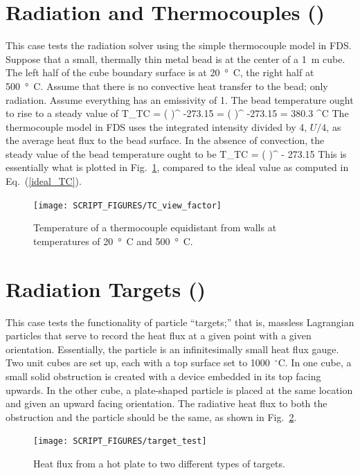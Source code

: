\documentclass[11pt]{book}
\begin{document}
\section{Radiation and Thermocouples (\texorpdfstring{}{TC\_view\_factor}) }
\label{TC_view_factor}

This case tests the radiation solver using the simple thermocouple model in FDS.  Suppose that a small, thermally thin metal bead is at the center of a 1~m cube. The left half of the cube boundary surface is at 20~\si{\degree C}, the right half at 500~\si{\degree C}. Assume that there is no convective heat transfer to the bead; only radiation. Assume everything has an emissivity of 1. The bead temperature ought to rise to a steady value of
\be
   T_{\hbox{\tiny TC}} = \left(  \right)^ -273.15 = \left(  \right)^ -273.15 = 380.3 \quad ^\circ \hbox{C}
   \label{ideal_TC}
\ee
The thermocouple model in FDS uses the integrated intensity divided by 4, $U/4$, as the average heat flux to the bead surface. In the absence of convection, the steady value of the bead temperature ought to be
\be
   T_{\hbox{\tiny TC}} = \left(  \right)^ - 273.15
\ee
This is essentially what is plotted in Fig.~\ref{TC_view_factor_plot}, compared to the ideal value as computed in Eq.~(\ref{ideal_TC}).
\begin{figure}[ht]
\centering
\texttt{[image: SCRIPT\_FIGURES/TC\_view\_factor]}
\caption[Radiation/thermocouple test case]{Temperature of a thermocouple equidistant from walls at temperatures of 20~\si{\degree C} and 500~\si{\degree C}.}
\label{TC_view_factor_plot}
\end{figure}



\section{Radiation Targets (\texorpdfstring{}{target\_test}) }
\label{target_test}

This case tests the functionality of particle ``targets;'' that is, massless Lagrangian particles that serve to record the heat flux at a given point with a given orientation. Essentially, the particle is an infinitesimally small heat flux gauge. Two unit cubes are set up, each with a top surface set to 1000~$^\circ$C. In one cube, a small solid obstruction is created with a device embedded in its top facing upwards. In the other cube, a plate-shaped particle is placed at the same location and given an upward facing orientation. The radiative heat flux to both the obstruction and the particle should be the same, as shown in Fig.~\ref{target_test_plot}.
\begin{figure}[ht]
\centering
\texttt{[image: SCRIPT\_FIGURES/target\_test]}
\caption[The  case]{Heat flux from a hot plate to two different types of targets.}
\label{target_test_plot}
\end{figure}
\end{document}

